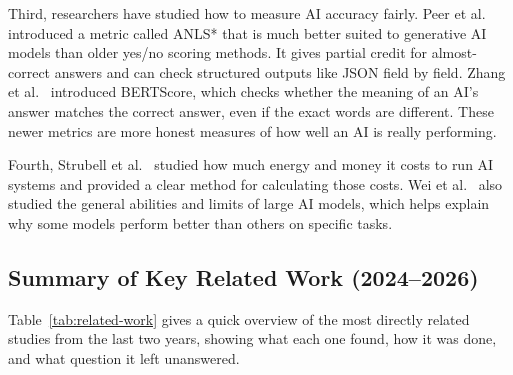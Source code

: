 Third, researchers have studied how to measure AI accuracy fairly. Peer et al.\ \cite{anlsstar_2024} introduced a metric called ANLS* that is much better suited to generative AI models than older yes/no scoring methods. It gives partial credit for almost-correct answers and can check structured outputs like JSON field by field. Zhang et al.\ \cite{zhang_bertscore_2020} introduced BERTScore, which checks whether the meaning of an AI's answer matches the correct answer, even if the exact words are different. These newer metrics are more honest measures of how well an AI is really performing.

Fourth, Strubell et al.\ \cite{strubell2019energy} studied how much energy and money it costs to run AI systems and provided a clear method for calculating those costs. Wei et al.\ \cite{wei2022emergent} also studied the general abilities and limits of large AI models, which helps explain why some models perform better than others on specific tasks.

\subsection{Summary of Key Related Work (2024--2026)}

Table~\ref{tab:related-work} gives a quick overview of the most directly related studies from the last two years, showing what each one found, how it was done, and what question it left unanswered.

